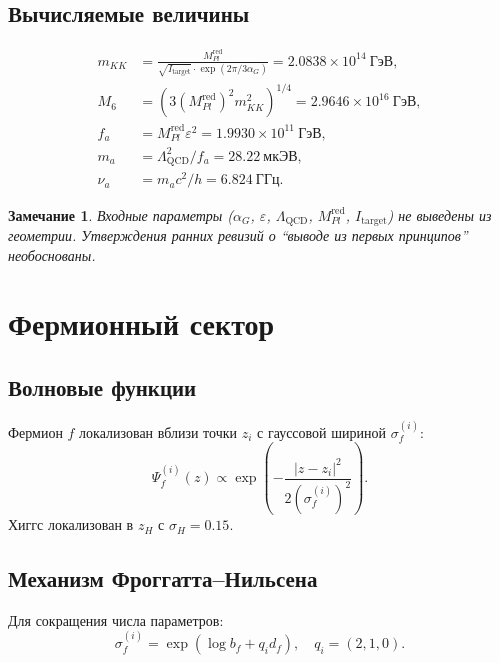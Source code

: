 \documentclass[11pt,a4paper]{article}
\numberwithin{equation}{section}
\newtheorem{remark}[theorem]{Замечание}
\begin{document}
\subsection{Вычисляемые величины}

\begin{align}
m_{KK} &= \frac{M_{Pl}^{\text{red}}}{\sqrt{I_{\text{target}}}
\cdot \exp(2\pi/3\alpha_G)} = 2.0838 \times 10^{14}~\text{ГэВ}, \\
M_6 &= (3(M_{Pl}^{\text{red}})^2 m_{KK}^2)^{1/4}
= 2.9646 \times 10^{16}~\text{ГэВ}, \\
f_a &= M_{Pl}^{\text{red}}\varepsilon^2
= 1.9930 \times 10^{11}~\text{ГэВ}, \\
m_a &= \Lambda_{\text{QCD}}^2/f_a
= 28.22~\text{мкЭВ}, \\
\nu_a &= m_a c^2/h = 6.824~\text{ГГц}.
\end{align}

\begin{remark}
Входные параметры ($\alpha_G$, $\varepsilon$,
$\Lambda_{\text{QCD}}$, $M_{Pl}^{\text{red}}$,
$I_{\text{target}}$) не выведены из геометрии.
Утверждения ранних ревизий о ``выводе из первых
принципов'' необоснованы.
\end{remark}

\section{Фермионный сектор}

\subsection{Волновые функции}

Фермион $f$ локализован вблизи точки $z_i$ с гауссовой
шириной $\sigma_f^{(i)}$:
\begin{equation}
\Psi_f^{(i)}(z) \propto \exp\left(-\frac{|z-z_i|^2}{2(\sigma_f^{(i)})^2}\right).
\end{equation}
Хиггс локализован в $z_H$ с $\sigma_H = 0.15$.

\subsection{Механизм Фроггатта--Нильсена}

Для сокращения числа параметров:
\begin{equation}
\sigma_f^{(i)} = \exp(\log b_f + q_i d_f), \quad q_i = (2,1,0).
\end{equation}
\end{document}
